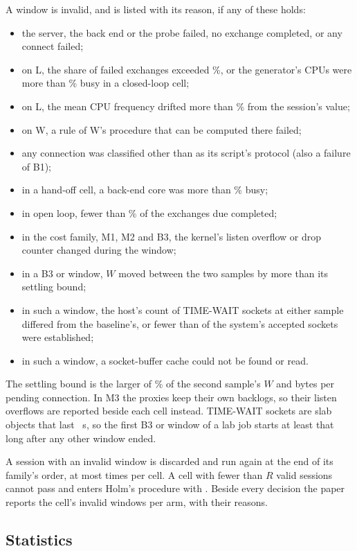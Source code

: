 A window is invalid, and is listed with its reason, if any of these holds:
\begin{itemize}
\item the server, the back end or the probe failed, no exchange completed, or any connect failed;
\item on L, the share of failed exchanges exceeded \ErrorSharePct\%, or the generator's CPUs were
more than \GenBusyPct\% busy in a closed-loop cell;
\item on L, the mean CPU frequency drifted more than \MhzDriftPct\% from the session's value;
\item on W, a rule of W's procedure that can be computed there failed;
\item any connection was classified other than as its script's protocol (also a failure of B1);
\item in a hand-off cell, a back-end core was more than \BackendBusyPct\% busy;
\item in open loop, fewer than \OpenDonePct\% of the exchanges due completed;
\item in the cost family, M1, M2 and B3, the kernel's listen overflow or drop counter changed
during the window;
\item in a B3 or \ophold{} window, $W$ moved between the two samples by more than its settling
bound;
\item in such a window, the host's count of TIME-WAIT sockets at either sample differed from the
baseline's, or fewer than \NPend{} of the system's accepted sockets were established;
\item in such a window, a socket-buffer cache could not be found or read.
\end{itemize}
The settling bound is the larger of \SettlePct\% of the second sample's $W$ and \SettleAbs{} bytes
per pending connection. In M3 the proxies keep their own backlogs, so their listen overflows are
reported beside each cell instead.
TIME-WAIT sockets are slab objects that last \TimeWaitS{}~s, so the first B3 or \ophold{} window of
a lab job starts at least that long after any other window ended.

A session with an invalid window is discarded and run again at the end of its family's order, at
most \RerunCap{} times per cell. A cell with fewer than $R$ valid sessions cannot pass and enters
Holm's procedure with \PIsOne{}. Beside every decision the paper reports the cell's invalid windows
per arm, with their reasons.

\subsection{Statistics}\label{sec:stats}

